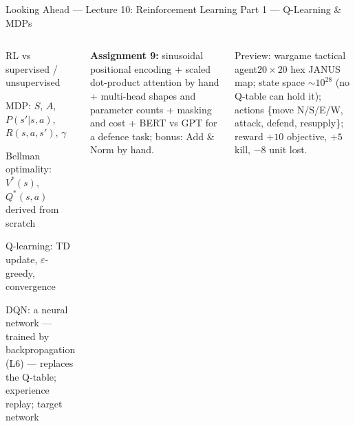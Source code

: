 \documentclass[aspectratio=169,10pt]{beamer}
\begin{document}
\begin{frame}{Looking Ahead --- Lecture 10: Reinforcement Learning Part 1 --- Q-Learning \& MDPs}
\begin{columns}[T]
\begin{tl}\item RL vs supervised / unsupervised\item MDP: $S$, $A$, $P(s'|s,a)$, $R(s,a,s')$, $\gamma$\item Bellman optimality: $V^*(s)$, $Q^*(s,a)$ derived from scratch\item Q-learning: TD update, $\varepsilon$-greedy, convergence\item DQN: a neural network --- trained by backpropagation (L6) --- replaces the Q-table; experience replay; target network\end{tl}
\begin{ibox}\scriptsize\textbf{Assignment 9:} sinusoidal positional encoding + scaled dot-product attention by hand + multi-head shapes and parameter counts + masking and cost + BERT vs GPT for a defence task; bonus: Add \& Norm by hand.\end{ibox}
\begin{cbox}{Preview: wargame tactical agent}\scriptsize $20\times20$ hex JANUS map; state space $\sim10^{28}$ (no Q-table can hold it); actions \{move N/S/E/W, attack, defend, resupply\}; reward $+10$ objective, $+5$ kill, $-8$ unit lost.\end{cbox}
\end{columns}
\end{frame}
\end{document}
